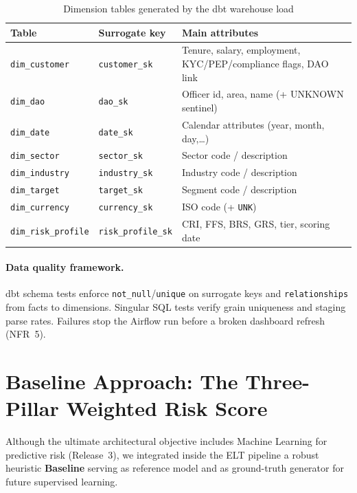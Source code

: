 \begin{table}[H]
\centering
\caption{Dimension tables generated by the dbt warehouse load}
\label{tab:dim-tables}
\renewcommand{\arraystretch}{1.2}
\scriptsize
\begin{tabular}{|p{3.0cm}|p{2.6cm}|p{8.2cm}|}
\hline
\rowcolor{blue!15}
\textbf{Table} & \textbf{Surrogate key} & \textbf{Main attributes} \\
\hline
\texttt{dim\_customer} & \texttt{customer\_sk} & Tenure, salary, employment, KYC/PEP/compliance flags, DAO link \\
\hline
\texttt{dim\_dao} & \texttt{dao\_sk} & Officer id, area, name (+ UNKNOWN sentinel) \\
\hline
\texttt{dim\_date} & \texttt{date\_sk} & Calendar attributes (year, month, day,\ldots) \\
\hline
\texttt{dim\_sector} & \texttt{sector\_sk} & Sector code / description \\
\hline
\texttt{dim\_industry} & \texttt{industry\_sk} & Industry code / description \\
\hline
\texttt{dim\_target} & \texttt{target\_sk} & Segment code / description \\
\hline
\texttt{dim\_currency} & \texttt{currency\_sk} & ISO code (+ \texttt{UNK}) \\
\hline
\texttt{dim\_risk\_profile} & \texttt{risk\_profile\_sk} & CRI, FFS, BRS, GRS, tier, scoring date \\
\hline
\end{tabular}
\end{table}

\paragraph{Data quality framework.}
dbt schema tests enforce \texttt{not\_null}/\texttt{unique} on surrogate keys and
\texttt{relationships} from facts to dimensions. Singular SQL tests verify grain
uniqueness and staging parse rates. Failures stop the Airflow run before a broken
dashboard refresh (NFR~5).

\section{Baseline Approach: The Three-Pillar Weighted Risk Score}
\label{sec:three_pillar_model}
Although the ultimate architectural objective includes Machine Learning for
predictive risk (Release~3), we integrated inside the ELT pipeline a robust
heuristic \textbf{Baseline} serving as reference model and as ground-truth
generator for future supervised learning.

